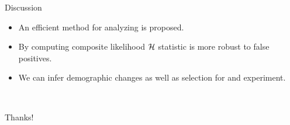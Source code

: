 \documentclass[t]{beamer} %
\begin{document}
\begin{frame}{ Discussion}
	\begin{itemize}
		\item An efficient method for analyzing  is proposed.
		\pause
		\item By computing composite likelihood ${\cal H}$ statistic is more robust 
		to false positives.	
		\pause 
		\item We can infer demographic changes as well as selection for and 
		experiment.
	\end{itemize}
\end{frame}

\begin{frame}{\ }
	\vspace{1	in}
	\begin{center}
		\huge{Thanks!}\\
	\end{center}
	
\end{frame}
\end{document}
